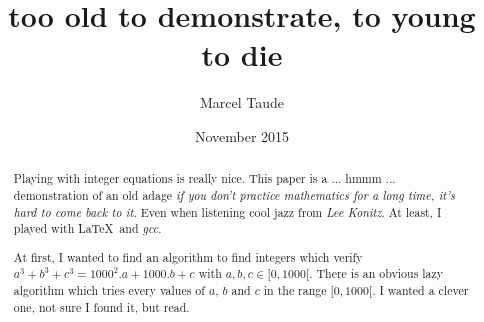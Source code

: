 




\title{too old to demonstrate, to young to die}
\author{Marcel Taude}
\date{November 2015}

\begin{abstract}
	Playing with integer equations is really nice. This paper is a ... hmmm ... demonstration of an old adage \emph{if you don't practice mathematics for a long time, it's hard to come back to it}. Even when listening cool jazz from \emph{Lee Konitz}. At least, I played with \LaTeX\ and \emph{gcc}.

	At first, I wanted to find an algorithm to find integers which verify $a^3 + b^3 + c^3 = 1000^2.a + 1000.b + c$ with $a, b, c \in [0, 1000[$. There is an obvious lazy algorithm which tries every values of $a$, $b$ and $c$ in the range $[0, 1000[$. I wanted a clever one, not sure I found it, but read.
\end{abstract}	

\maketitle

\tableofcontents








